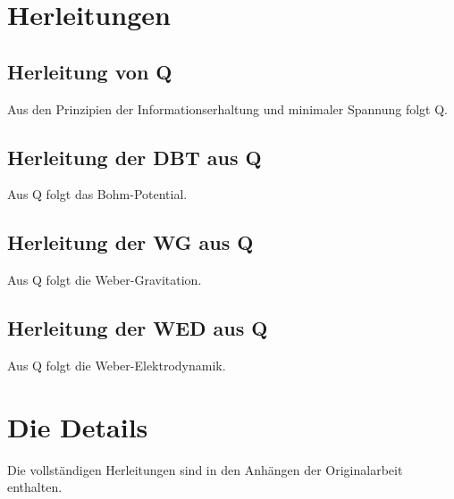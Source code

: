 
\section{Herleitungen}

\subsection{Herleitung von Q}

Aus den Prinzipien der Informationserhaltung und minimaler Spannung folgt Q.

\subsection{Herleitung der DBT aus Q}

Aus Q folgt das Bohm-Potential.

\subsection{Herleitung der WG aus Q}

Aus Q folgt die Weber-Gravitation.

\subsection{Herleitung der WED aus Q}

Aus Q folgt die Weber-Elektrodynamik.

\section{Die Details}

Die vollständigen Herleitungen sind in den Anhängen der Originalarbeit enthalten.